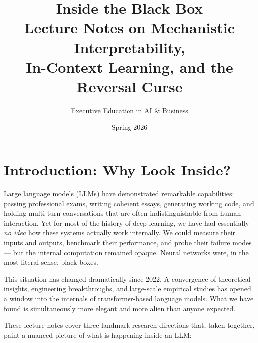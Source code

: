 \documentclass[11pt, a4paper]{article}
\title{\textbf{Inside the Black Box}\\[6pt]
  \large Lecture Notes on Mechanistic Interpretability,\\
  In-Context Learning, and the Reversal Curse}
\author{Executive Education in AI \& Business}
\date{Spring 2026}
\theoremstyle{definition}
\theoremstyle{plain}
\begin{document}
\maketitle
\tableofcontents
\newpage

\section{Introduction: Why Look Inside?}

Large language models (LLMs) have demonstrated remarkable capabilities:
passing professional exams, writing coherent essays, generating working code,
and holding multi-turn conversations that are often indistinguishable from
human interaction.  Yet for most of the history of deep learning, we have had
essentially \emph{no idea} how these systems actually work internally.  We
could measure their inputs and outputs, benchmark their performance, and
probe their failure modes --- but the internal computation remained opaque.
Neural networks were, in the most literal sense, black boxes.

This situation has changed dramatically since 2022.  A convergence of
theoretical insights, engineering breakthroughs, and large-scale empirical
studies has opened a window into the internals of transformer-based language
models.  What we have found is simultaneously more elegant and more alien
than anyone expected.

These lecture notes cover three landmark research directions that, taken
together, paint a nuanced picture of what is happening inside an LLM:
\end{document}
